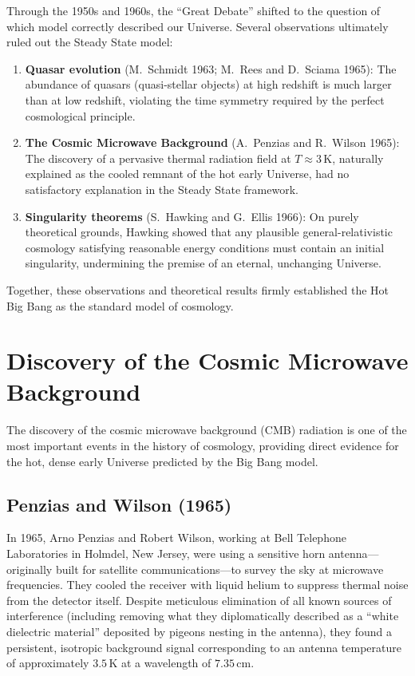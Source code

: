 Through the 1950s and 1960s, the ``Great Debate'' shifted to the question of which model correctly described our Universe. Several observations ultimately ruled out the Steady State model:
\begin{enumerate}
    \item \textbf{Quasar evolution} (M.~Schmidt 1963; M.~Rees and D.~Sciama 1965): The abundance of quasars (quasi-stellar objects) at high redshift is much larger than at low redshift, violating the time symmetry required by the perfect cosmological principle.
    \item \textbf{The Cosmic Microwave Background} (A.~Penzias and R.~Wilson 1965): The discovery of a pervasive thermal radiation field at $T\approx 3\,\mathrm{K}$, naturally explained as the cooled remnant of the hot early Universe, had no satisfactory explanation in the Steady State framework.
    \item \textbf{Singularity theorems} (S.~Hawking and G.~Ellis 1966): On purely theoretical grounds, Hawking showed that any plausible general-relativistic cosmology satisfying reasonable energy conditions must contain an initial singularity, undermining the premise of an eternal, unchanging Universe.
\end{enumerate}

Together, these observations and theoretical results firmly established the Hot Big Bang as the standard model of cosmology.


\section{Discovery of the Cosmic Microwave Background}
\label{sec:cmb_discovery}

The discovery of the cosmic microwave background (CMB) radiation is one of the most important events in the history of cosmology, providing direct evidence for the hot, dense early Universe predicted by the Big Bang model.

\subsection*{Penzias and Wilson (1965)}

In 1965, Arno Penzias and Robert Wilson, working at Bell Telephone Laboratories in Holmdel, New Jersey, were using a sensitive horn antenna---originally built for satellite communications---to survey the sky at microwave frequencies. They cooled the receiver with liquid helium to suppress thermal noise from the detector itself. Despite meticulous elimination of all known sources of interference (including removing what they diplomatically described as a ``white dielectric material'' deposited by pigeons nesting in the antenna), they found a persistent, isotropic background signal corresponding to an antenna temperature of approximately $3.5\,\mathrm{K}$ at a wavelength of $7.35\,\mathrm{cm}$.

